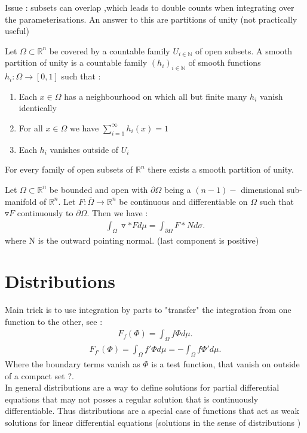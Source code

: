 Issue : subsets can overlap ,which leads to double counts when integrating over the parameterisations.
An answer to this are partitions of unity (not practically useful)
\begin{definition}
  Let $\Omega  \subset  \mathbb{R}^{n } $ be covered by a countable family $U_{i \in  \mathbb{N}}$ of open subsets.
  A smooth partition of unity is a countable family $(h_i)_{i \in  \mathbb{N}}$ of smooth functions $h_i : \Omega  \to [0,1]$ such that : 
  \begin{enumerate}
    \item Each $x \in  \Omega $ has a neighbourhood on which all but finite many $h_i$ vanish identically
    \item For all $x \in  \Omega $ we have $\sum_{i=1}^{\infty} h_i(x) = 1$
    \item Each $h_i$ vanishes outside of $U_i$
  \end{enumerate}
  For every family of open subsets of $\mathbb{R}^{n} $ there exists a smooth partition of unity.
\end{definition}
\begin{theorem}
  Let $\Omega \subset  \mathbb{R}^{n }  $ be bounded and open with $\partial \Omega $ being a 
  $(n-1)-$ dimensional sub-manifold of $\mathbb{R}^{n } $. Let $F : \overline{\Omega}  \to  \mathbb{R}^{n } $ be continuous and 
  differentiable on $\Omega $ such that $\triangledown F$ continuously to $\partial \Omega $. Then we have : 
  \begin{align*}
    \int_{\Omega } \triangledown * F d\mu = \int_{\partial \Omega } F * N d\sigma
  .\end{align*}
  where N is the outward pointing normal. (last component is positive)
\end{theorem}
\begin{comment}
 The symbol $d\sigma$ in this case means that the integral is a surface integral and not a classical integral on a subset of $\mathbb{R}^{n } $.
\end{comment}


\section{Distributions} %
\label{sec:Distributions}
Main trick is to use integration by parts to "transfer" the integration from one function to the other, see : 
\begin{align*}
  F_f(\Phi) =  \int_\Omega f \Phi d\mu 
.\end{align*} 
\begin{align*}
  F_{f'}(\Phi) = \int_\Omega f' \Phi  d\mu  = -\int_\Omega f \Phi' d\mu  
.\end{align*}
Where the boundary terms vanish as $\Phi $ is a test function, that vanish on outside of a compact set ?.\\[1ex]
In general distributions are a way to define solutions for partial differential equations 
that may not posses a regular solution that is continuously differentiable. Thus distributions are a special case of functions 
that act as weak solutions for linear differential equations  (solutions in the sense of distributions )
